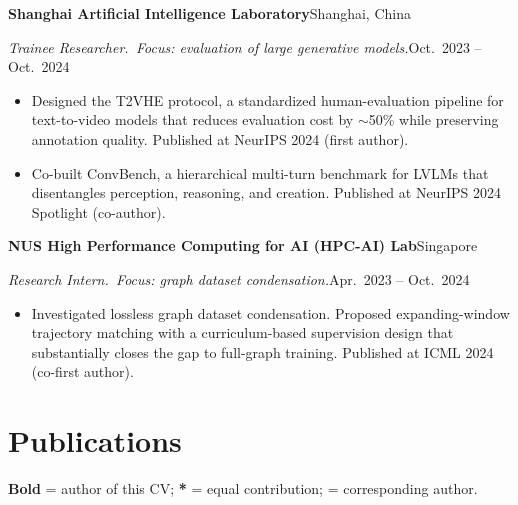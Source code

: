\documentclass[10pt,a4paper]{article}
\newcommand{\row}[2]{\noindent\textbf{#1}\hfill #2\par}
\newcommand{\subrow}[2]{\noindent\textit{#1}\hfill #2\par}
\begin{document}
\row{Shanghai Artificial Intelligence Laboratory}{Shanghai, China}
\subrow{Trainee Researcher.\, Focus: evaluation of large generative models.}{Oct.~2023 -- Oct.~2024}
\begin{itemize}
  \item Designed the T2VHE protocol, a standardized human-evaluation pipeline for text-to-video models that reduces evaluation cost by $\sim$50\% while preserving annotation quality. Published at NeurIPS 2024 (first author).
  \item Co-built ConvBench, a hierarchical multi-turn benchmark for LVLMs that disentangles perception, reasoning, and creation. Published at NeurIPS 2024 Spotlight (co-author).
\end{itemize}

\row{NUS High Performance Computing for AI (HPC-AI) Lab}{Singapore}
\subrow{Research Intern.\, Focus: graph dataset condensation.}{Apr.~2023 -- Oct.~2024}
\begin{itemize}
  \item Investigated lossless graph dataset condensation. Proposed expanding-window trajectory matching with a curriculum-based supervision design that substantially closes the gap to full-graph training. Published at ICML 2024 (co-first author).
\end{itemize}

\section*{Publications}
{\footnotesize \textbf{Bold} = author of this CV;\; \textbf{*} = equal contribution;\; \textbf{\dag} = corresponding author.}\par
\vspace{2pt}
\end{document}

